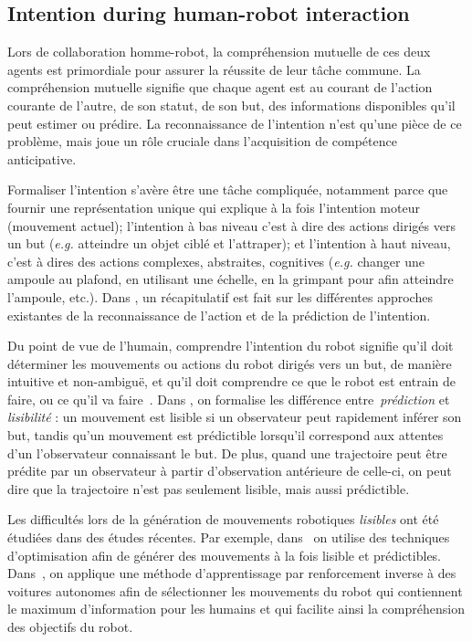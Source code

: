 \documentclass[utf8]{frontiersSCNS} %
\begin{document}
\subsection{Intention during human-robot interaction}
Lors de collaboration homme-robot, la compréhension mutuelle de ces deux agents est primordiale pour assurer la réussite de leur tâche commune.
La compréhension mutuelle signifie que chaque agent est au courant de l'action courante de l'autre, de son statut, de son but, des informations disponibles qu'il peut estimer ou prédire.
La reconnaissance de l'intention n'est qu'une pièce de ce problème, mais joue un rôle cruciale dans l’acquisition de compétence anticipative.

Formaliser l'intention s'avère être une tâche compliquée, notamment parce que fournir une représentation unique qui explique à la fois l'intention moteur (mouvement actuel); l'intention 
 à bas niveau c'est à dire des actions dirigés vers un but (\textit{e.g.} atteindre un objet ciblé et l'attraper); et l'intention à haut niveau, c'est à dires des actions complexes, abstraites, cognitives (\textit{e.g.} changer une ampoule au plafond, en utilisant une échelle, en la grimpant pour afin atteindre l'ampoule, etc.).
Dans \cite{demiris2007prediction}, un récapitulatif est fait sur les différentes approches existantes de la reconnaissance de l'action et de la prédiction de l'intention.

Du point de vue de l'humain, comprendre l'intention du robot signifie qu'il doit déterminer les mouvements ou actions du robot dirigés vers un but, de manière intuitive et non-ambiguë, et qu'il doit comprendre ce que le robot est entrain de faire, ou ce qu'il va faire~\citep{kim2017collaborative}. 
Dans \cite{dragan2014integrating}, on formalise les différence entre~\textit{prédiction} et \textit{lisibilité} : un mouvement est lisible si un observateur peut rapidement inférer son but, tandis qu'un mouvement est prédictible lorsqu'il correspond aux attentes d'un l'observateur connaissant le but. De plus, quand une trajectoire peut être prédite par un observateur à partir d’observation antérieure de celle-ci, on peut dire que la trajectoire n’est pas seulement lisible, mais aussi prédictible.

Les difficultés lors de la génération de mouvements robotiques \textit{lisibles} ont été étudiées dans des études récentes. Par exemple, dans~\cite{dragan2014integrating} on utilise des techniques d'optimisation afin de générer des mouvements à la fois lisible et prédictibles.
Dans~\cite{HuangHAD17}, on applique une méthode d'apprentissage par renforcement inverse à des voitures autonomes afin de sélectionner les mouvements du robot qui contiennent le maximum d'information pour les humains et qui facilite ainsi la compréhension des objectifs du robot.
\end{document}
